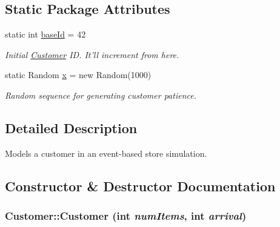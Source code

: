 \subsection*{Static Package Attributes}
\begin{CompactItemize}
\item 
\hypertarget{class_customer_ac5e70d5b72179a4df902ef65ef09e7e}{
static int \hyperlink{class_customer_ac5e70d5b72179a4df902ef65ef09e7e}{baseId} = 42}
\label{class_customer_ac5e70d5b72179a4df902ef65ef09e7e}

\begin{CompactList}\small\item\em Initial \hyperlink{class_customer}{Customer} ID. It'll increment from here. \item\end{CompactList}\item 
\hypertarget{class_customer_d81371bd3eb86b018a7aed8770c118bd}{
static Random \hyperlink{class_customer_d81371bd3eb86b018a7aed8770c118bd}{x} = new Random(1000)}
\label{class_customer_d81371bd3eb86b018a7aed8770c118bd}

\begin{CompactList}\small\item\em Random sequence for generating customer patience. \item\end{CompactList}\end{CompactItemize}


\subsection{Detailed Description}
Models a customer in an event-based store simulation. 

\subsection{Constructor \& Destructor Documentation}
\hypertarget{class_customer_69f5e0864420308a7842c74b84f8635a}{
\subsubsection[{Customer}]{\setlength{\rightskip}{0pt plus 5cm}Customer::Customer (int {\em numItems}, \/  int {\em arrival})}}
\label{class_customer_69f5e0864420308a7842c74b84f8635a}


